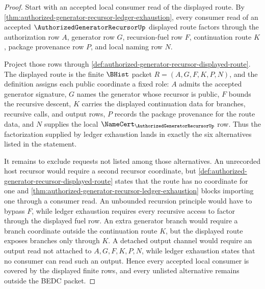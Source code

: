 \begin{proof}
Start with an accepted local consumer read of the displayed route. By \autoref{thm:authorized-generator-recursor-ledger-exhaustion}, every consumer read of an accepted $\AuthorizedGeneratorRecursorUp$ displayed route factors through the authorization row $A$, generator row $G$, recursion-fuel row $F$, continuation route $K$, package provenance row $P$, and local naming row $N$.

Project those rows through \autoref{def:authorized-generator-recursor-displayed-route}. The displayed route is the finite $\BHist$ packet $R=(A,G,F,K,P,N)$, and the definition assigns each public coordinate a fixed role: $A$ admits the accepted generator signature, $G$ names the generator whose recursor is public, $F$ bounds the recursive descent, $K$ carries the displayed continuation data for branches, recursive calls, and output rows, $P$ records the package provenance for the route data, and $N$ supplies the local $\NameCert_{\AuthorizedGeneratorRecursorUp}$ row. Thus the factorization supplied by ledger exhaustion lands in exactly the six alternatives listed in the statement.

It remains to exclude requests not listed among those alternatives. An unrecorded host recursor would require a second recursor coordinate, but \autoref{def:authorized-generator-recursor-displayed-route} states that the route has no coordinate for one and \autoref{thm:authorized-generator-recursor-ledger-exhaustion} blocks importing one through a consumer read. An unbounded recursion principle would have to bypass $F$, while ledger exhaustion requires every recursive access to factor through the displayed fuel row. An extra generator branch would require a branch coordinate outside the continuation route $K$, but the displayed route exposes branches only through $K$. A detached output channel would require an output read not attached to $A,G,F,K,P,N$, while ledger exhaustion states that no consumer can read such an output. Hence every accepted local consumer is covered by the displayed finite rows, and every unlisted alternative remains outside the BEDC packet.
\end{proof}

